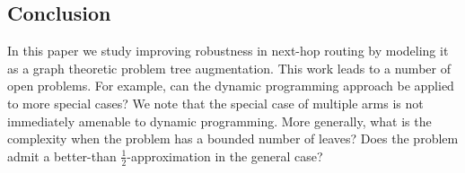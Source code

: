 \documentclass{article}
\begin{document}
\subsection*{Conclusion}
In this paper we study improving robustness in next-hop routing by
modeling it as a graph theoretic problem {\sc tree augmentation}.
This work leads to a number of open problems. For example, can the
dynamic programming approach be applied to more special cases?  We
note that the special case of multiple arms is not immediately
amenable to dynamic programming. More generally, what is the
complexity when the problem has a bounded number of leaves?  Does the
problem admit a better-than $\frac{1}{2}$-approximation in the general case?



 

\end{document}
